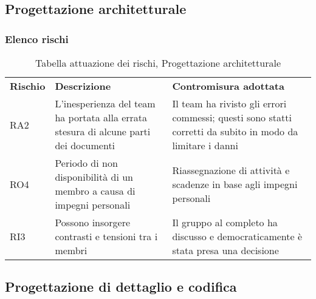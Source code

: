 \newpage
\subsection{Progettazione architetturale}
\subsubsection{Elenco rischi}
\begin{table}[h]
\caption{Tabella attuazione dei rischi, Progettazione architetturale}
\begin{center}
\begin{tabular}{p{2cm}p{6cm}p{6cm}}
\textbf{Rischio} & \textbf{Descrizione}                                                                                                        & \textbf{Contromisura adottata}                                                                                                                                                   \\
RA2              & L'inesperienza del team ha portata alla errata stesura di alcune parti dei documenti & Il team ha rivisto gli errori commessi; questi sono statti corretti da subito in modo da limitare i danni
\\
RO4 & Periodo di non disponibilità di un membro a causa di impegni personali & Riassegnazione di attività e scadenze in base agli impegni personali
\\
RI3 & Possono insorgere contrasti e tensioni tra i membri & Il gruppo al completo ha discusso e democraticamente è stata presa una decisione
\end{tabular}
\end{center}
\end{table}

\subsection{Progettazione di dettaglio e codifica}
